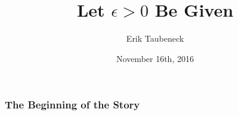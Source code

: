 \documentclass[10pt]{beamer}
\title{
  {\bf{\textsf{
        Let $\epsilon > 0$ Be Given
}}}}
\author[Erik Taubeneck]{Erik Taubeneck}
\institute[GameChanger]
{
{GameChanger}
}
\date{November 16th, 2016}
\begin{document}
\begin{frame}
  \titlepage
\end{frame}



\begin{frame}
  \frametitle{The Beginning of the Story}


\end{frame}
\end{document}
